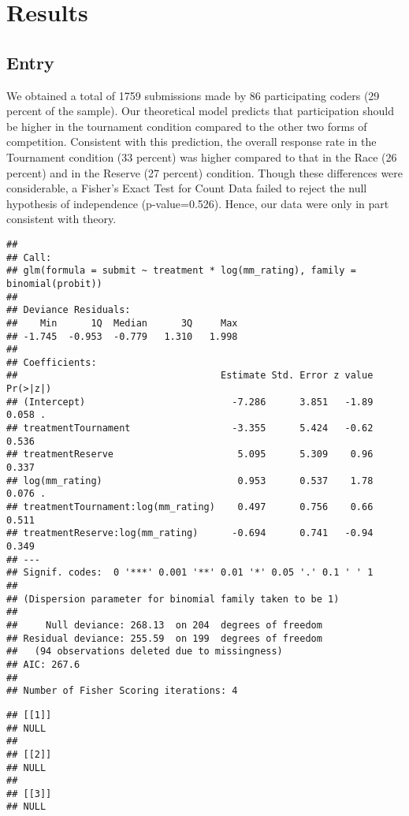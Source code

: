\documentclass[11pt, titlepage]{article}
\begin{document}
\section{Results}\label{results}

\subsection{Entry}\label{entry}

We obtained a total of 1759 submissions made by 86 participating coders
(29 percent of the sample). Our theoretical model predicts that
participation should be higher in the tournament condition compared to
the other two forms of competition. Consistent with this prediction, the
overall response rate in the Tournament condition (33 percent) was
higher compared to that in the Race (26 percent) and in the Reserve (27
percent) condition. Though these differences were considerable, a
Fisher's Exact Test for Count Data failed to reject the null hypothesis
of independence (p-value=0.526). Hence, our data were only in part
consistent with theory.

\begin{verbatim}
## 
## Call:
## glm(formula = submit ~ treatment * log(mm_rating), family = binomial(probit))
## 
## Deviance Residuals: 
##    Min      1Q  Median      3Q     Max  
## -1.745  -0.953  -0.779   1.310   1.998  
## 
## Coefficients:
##                                    Estimate Std. Error z value Pr(>|z|)  
## (Intercept)                          -7.286      3.851   -1.89    0.058 .
## treatmentTournament                  -3.355      5.424   -0.62    0.536  
## treatmentReserve                      5.095      5.309    0.96    0.337  
## log(mm_rating)                        0.953      0.537    1.78    0.076 .
## treatmentTournament:log(mm_rating)    0.497      0.756    0.66    0.511  
## treatmentReserve:log(mm_rating)      -0.694      0.741   -0.94    0.349  
## ---
## Signif. codes:  0 '***' 0.001 '**' 0.01 '*' 0.05 '.' 0.1 ' ' 1
## 
## (Dispersion parameter for binomial family taken to be 1)
## 
##     Null deviance: 268.13  on 204  degrees of freedom
## Residual deviance: 255.59  on 199  degrees of freedom
##   (94 observations deleted due to missingness)
## AIC: 267.6
## 
## Number of Fisher Scoring iterations: 4
\end{verbatim}

\begin{verbatim}
## [[1]]
## NULL
## 
## [[2]]
## NULL
## 
## [[3]]
## NULL
\end{verbatim}
\end{document}
